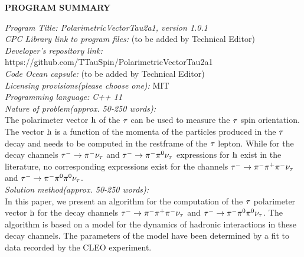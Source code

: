 \ifx\ver\verPAPER
{\bf PROGRAM SUMMARY} \\
\begin{small}
\noindent
{\em Program Title: PolarimetricVectorTau2a1, version 1.0.1} \\
{\em CPC Library link to program files:} (to be added by Technical Editor) \\
{\em Developer's repository link:} https://github.com/TTauSpin/PolarimetricVectorTau2a1 \\
{\em Code Ocean capsule:} (to be added by Technical Editor)\\
{\em Licensing provisions(please choose one):} 
MIT \\
{\em Programming language: C++ 11} \\
{\em Nature of problem(approx. 50-250 words):}\\
  The polarimeter vector $\textrm{h}$ of the $\tau$ can be used to measure the $\tau$ spin orientation.
  The vector $\textrm{h}$ is a function of the momenta of the particles produced in the $\tau$ decay {\color{blue} and needs to be computed in the restframe of the $\tau$ lepton}. 
  While for the decay channels $\tau^{-} \to \pi^{-}\nu_{\tau}$ and $\tau^{-} \to \pi^{-}\pi^{\textrm{0}}\nu_{\tau}$ expressions for $\textrm{h}$ exist in the literature,
  no corresponding expressions exist for the channels $\tau^{-} \to \pi^{-}\pi^{+}\pi^{-}\nu_{\tau}$ and $\tau^{-} \to \pi^{-}\pi^{\textrm{0}}\pi^{\textrm{0}}\nu_{\tau}$. \\
{\em Solution method(approx. 50-250 words):}\\
  In this paper, we present an algorithm for the computation of the $\tau$ polarimeter vector $\textrm{h}$ for the decay channels $\tau^{-} \to \pi^{-}\pi^{+}\pi^{-}\nu_{\tau}$ and $\tau^{-} \to \pi^{-}\pi^{\textrm{0}}\pi^{\textrm{0}}\nu_{\tau}$.
  The algorithm is based on a model for the dynamics of hadronic interactions in these decay channels.
  The parameters of the model have been determined by a fit to data recorded by the CLEO experiment.
   \\
\end{small}   
\fi


